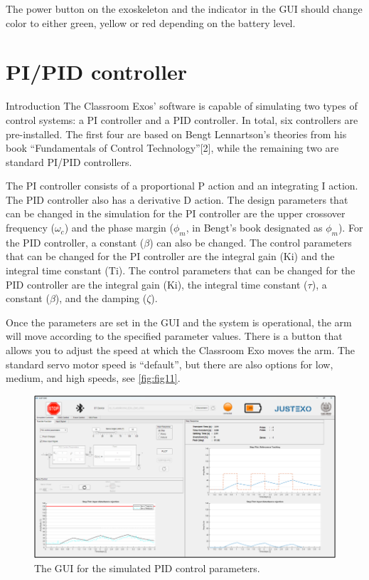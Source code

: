The power button on the exoskeleton and the indicator in the GUI should change color to either green, yellow or red depending on the battery level.


\newpage
\section{PI/PID controller}
Introduction
The Classroom Exos’ software is capable of simulating two types of control systems: a PI controller and a PID controller. In total, six controllers are pre-installed. The first four are based on Bengt Lennartson's theories from his book “Fundamentals of Control Technology”[2], while the remaining two are standard PI/PID controllers. 

The PI controller consists of a proportional P action and an integrating I action. The PID controller also has a derivative D action. The design parameters that can be changed in the simulation for the PI controller are the upper crossover frequency ($\omega_c$) and the phase margin ($\phi_m$, in Bengt's book designated as $\phi_m$). For the PID controller, a constant ($\beta$) can also be changed. The control parameters that can be changed for the PI controller are the integral gain (Ki) and the integral time constant (Ti). The control parameters that can be changed for the PID controller are the integral gain (Ki), the integral time constant ($\tau$), a constant ($\beta$), and the damping ($\zeta$).

Once the parameters are set in the GUI and the system is operational, the arm will move according to the specified parameter values. There is a button that allows you to adjust the speed at which the Classroom Exo moves the arm. The standard servo motor speed is “default”, but there are also options for low, medium, and high speeds, see \autoref{fig:fig11}.

\begin{figure}[H]
	\centering
	\includegraphics[width=0.7\linewidth]{img/fig_11}
	\caption{The GUI for the simulated PID control parameters.}
	\label{fig:fig11}
\end{figure}


